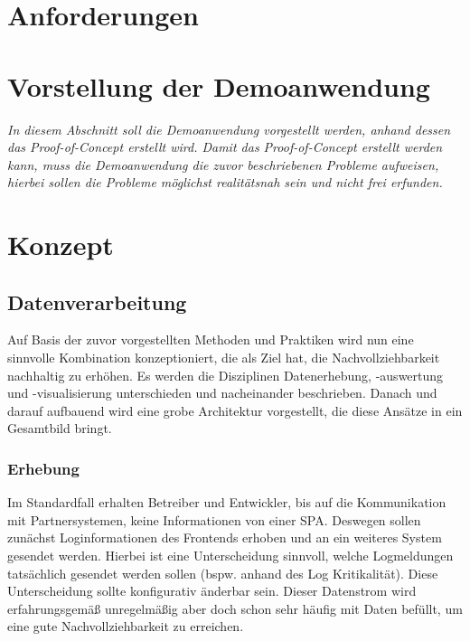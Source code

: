 	
\section{Anforderungen}

	
\section{Vorstellung der Demoanwendung}

	\textit{In diesem Abschnitt soll die Demoanwendung vorgestellt werden, anhand dessen das Proof-of-Concept erstellt wird. Damit das Proof-of-Concept erstellt werden kann, muss die Demoanwendung die zuvor beschriebenen Probleme aufweisen, hierbei sollen die Probleme möglichst realitätsnah sein und nicht frei erfunden.}
	
\newpage
	
\section{Konzept}
	
	\subsection{Datenverarbeitung}

	Auf Basis der zuvor vorgestellten Methoden und Praktiken wird nun eine sinnvolle Kombination konzeptioniert, die als Ziel hat, die Nachvollziehbarkeit nachhaltig zu erhöhen. Es werden die Disziplinen Datenerhebung, -auswertung und -visualisierung unterschieden und nacheinander beschrieben. Danach und darauf aufbauend wird eine grobe Architektur vorgestellt, die diese Ansätze in ein Gesamtbild bringt.
		
	\subsubsection{Erhebung}
		
	Im Standardfall erhalten Betreiber und Entwickler, bis auf die Kommunikation mit Partnersystemen, keine Informationen von einer SPA. Deswegen sollen zunächst Loginformationen des Frontends erhoben und an ein weiteres System gesendet werden. Hierbei ist eine Unterscheidung sinnvoll, welche Logmeldungen tatsächlich gesendet werden sollen (bspw. anhand des Log Kritikalität). Diese Unterscheidung sollte konfigurativ änderbar sein. Dieser Datenstrom wird erfahrungsgemäß unregelmäßig aber doch schon sehr häufig mit Daten befüllt, um eine gute Nachvollziehbarkeit zu erreichen.
		
